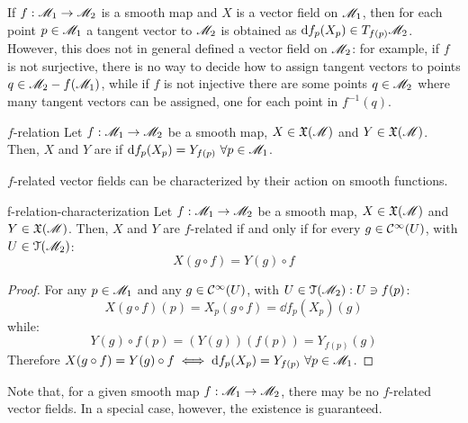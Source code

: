 If $ f : \mathscr{M}_1 \rightarrow \mathscr{M}_2 $ is a smooth map and $ X $ is a vector field on $ \mathscr{M}_1 $, then for each point $ p \in \mathscr{M}_1 $ a tangent vector to $ \mathscr{M}_2 $ is obtained as $ \mathrm{d} f_p(X_p) \in T_{f(p)}\mathscr{M}_2 $. However, this does not in general defined a vector field on $ \mathscr{M}_2 $: for example, if $ f $ is not surjective, there is no way to decide how to assign tangent vectors to points $ q \in \mathscr{M}_2 - f(\mathscr{M}_1) $, while if $ f $ is not injective there are some points $ q \in \mathscr{M}_2 $ where many tangent vectors can be assigned, one for each point in $ f^{-1}(q) $.

\begin{definition}{$ f $-relation}{}
  Let $ f : \mathscr{M}_1 \rightarrow \mathscr{M}_2 $ be a smooth map, $ X \in \mathfrak{X}(\mathscr{M}) $ and $ Y \in \mathfrak{X}(\mathscr{M}) $. Then, $ X $ and $ Y $ are  if $ \mathrm{d} f_p(X_p) = Y_{f(p)} \,\,\forall p \in \mathscr{M}_1 $.
\end{definition}

$ f $-related vector fields can be characterized by their action on smooth functions.

\begin{proposition}{}{f-relation-characterization}
  Let $ f : \mathscr{M}_1 \rightarrow \mathscr{M}_2 $ be a smooth map, $ X \in \mathfrak{X}(\mathscr{M}) $ and $ Y \in \mathfrak{X}(\mathscr{M}) $. Then, $ X $ and $ Y $ are $ f $-related if and only if for every $ g \in \mathcal{C}^{\infty}(U) $, with $ U \in \EuScript{T}(\mathscr{M}_2) $:
  \begin{equation}
    X(g \circ f) = Y(g) \circ f
  \end{equation}
\end{proposition}

\begin{proofbox}
  \begin{proof}
    For any $ p \in \mathscr{M}_1 $ and any $ g \in \mathcal{C}^{\infty}(U) $, with $ U \in \EuScript{T}(\mathscr{M}_2) : U \ni f(p) $:
    \begin{equation*}
      X(g \circ f)(p) = X_p(g \circ f) = \dd f_p(X_p) (g)
    \end{equation*}
    while:
    \begin{equation*}
      Y(g) \circ f(p) = (Y(g)) (f(p)) = Y_{f(p)} (g)
    \end{equation*}
    Therefore $ X(g \circ f) = Y(g) \circ f \iff \mathrm{d} f_p(X_p) = Y_{f(p)} \,\,\forall p \in \mathscr{M}_1 $.
  \end{proof}
\end{proofbox}

Note that, for a given smooth map $ f : \mathscr{M}_1 \rightarrow \mathscr{M}_2 $, there may be no $ f $-related vector fields. In a special case, however, the existence is guaranteed.

